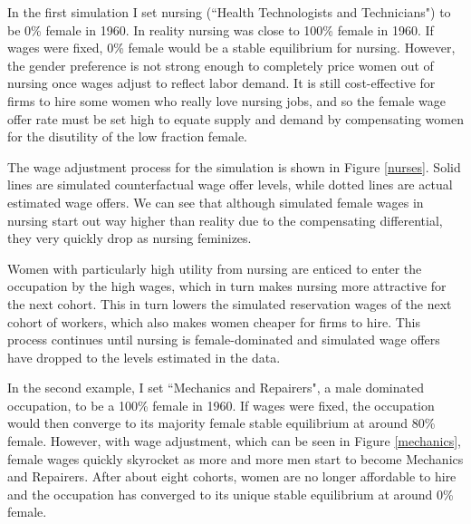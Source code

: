 \documentclass[11pt]{article}
\begin{document}

In the first simulation I set nursing (``Health Technologists and Technicians") to be 0\% female in 1960. In reality nursing was close to 100\% female in 1960. If wages were fixed, 0\% female would be a stable equilibrium for nursing. However, the gender preference is not strong enough to completely price women out of nursing once wages adjust to reflect labor demand. It is still cost-effective for firms to hire some women who really love nursing jobs, and so the female wage offer rate must be set high to equate supply and demand by compensating women for the disutility of the low fraction female.


The wage adjustment process for the simulation is shown in Figure \ref{nurses}. Solid lines are simulated counterfactual wage offer levels, while dotted lines are actual estimated wage offers. We can see that although simulated female wages in nursing start out way higher than reality due to the compensating differential, they very quickly drop as nursing feminizes. %

Women with particularly high utility from nursing are enticed to enter the occupation by the high wages, which in turn makes nursing more attractive for the next cohort. This in turn lowers the simulated reservation wages of the next cohort of workers, which also makes women cheaper for firms to hire. This process continues until nursing is female-dominated and simulated wage offers have dropped to the levels estimated in the data.

In the second example, I set ``Mechanics and Repairers", a male dominated occupation, to be a 100\% female in 1960. If wages were fixed, the occupation would then converge to its majority female stable equilibrium at around 80\% female. However, with wage adjustment, which can be seen in Figure \ref{mechanics}, female wages quickly skyrocket as more and more men start to become Mechanics and Repairers. After about eight cohorts, women are no longer affordable to hire and the occupation has converged to its unique stable equilibrium at around 0\% female.
\end{document}
